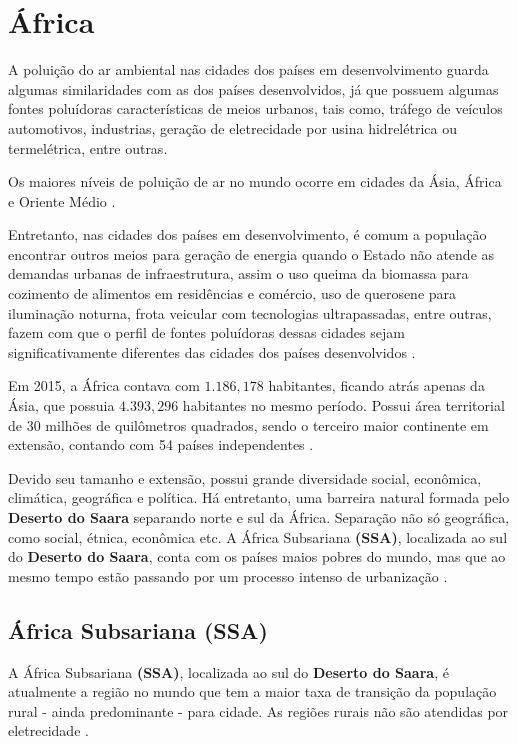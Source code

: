 \section{África}

A poluição do ar ambiental nas cidades dos países em desenvolvimento
guarda algumas similaridades com as dos países desenvolvidos, já que 
possuem algumas fontes poluídoras características de meios urbanos, 
tais como, tráfego de veículos automotivos, industrias, geração de 
eletrecidade por usina hidrelétrica ou termelétrica, entre outras. 

Os maiores níveis de poluição de ar no mundo ocorre
em cidades da Ásia, África e Oriente Médio \citep{brauer2012}. 

Entretanto, nas cidades dos países em desenvolvimento, é comum 
a população encontrar outros meios para geração de energia quando 
o Estado não atende as demandas urbanas de infraestrutura, assim o 
uso queima da biomassa para cozimento de alimentos em residências 
e comércio, uso de querosene para iluminação noturna, frota veicular
com tecnologias ultrapassadas, entre outras, fazem com que o perfil 
de fontes poluídoras dessas cidades sejam significativamente 
diferentes das cidades dos países desenvolvidos \citep{brauer2012}.

Em 2015, a África contava com $1.186,178$ habitantes, ficando atrás 
apenas da Ásia, que possuia $4.393,296$ habitantes no mesmo período. 
Possui área territorial de 30 milhões de quilômetros quadrados, sendo
o terceiro maior continente em extensão, contando com 54 países 
independentes \citep{UN}.

Devido seu tamanho e extensão, possui grande diversidade social, 
econômica, climática, geográfica e política. 
Há entretanto, uma barreira natural formada pelo \textbf{Deserto do Saara}
separando norte e sul da África. Separação não só geográfica, como
social, étnica, econômica etc. 
A África Subsariana \textbf{(SSA)}, localizada ao sul do \textbf{Deserto do Saara}, 
conta com os países maios pobres do mundo, mas que ao mesmo tempo estão
passando por um processo intenso de urbanização \citep{UN}. 
   	
\subsection{África Subsariana \textbf{(SSA)}}

A África Subsariana \textbf{(SSA)}, localizada ao sul do 
\textbf{Deserto do Saara}, é atualmente a região no mundo que tem a maior 
taxa de transição da população rural - ainda predominante - para cidade. 
As regiões rurais não são atendidas por eletrecidade \citep{MONTGOMERY2008}.

